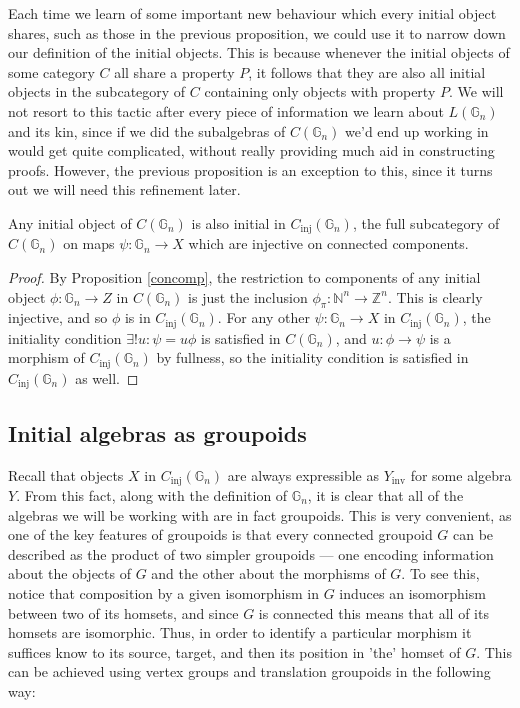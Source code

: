 \documentclass{amsart} %
\begin{document}
Each time we learn of some important new behaviour which every initial object shares, such as those in the previous proposition, we could use it to narrow down our definition of the initial objects. This is because whenever the initial objects of some category $C$ all share a property $P$, it follows that they are also all initial objects in the subcategory of $C$ containing only objects with property $P$. We will not resort to this tactic after every piece of information we learn about $L(\mathbb{G}_n)$ and its kin, since if we did the subalgebras of $C(\mathbb{G}_n)$ we'd end up working in would get quite complicated, without really providing much aid in constructing proofs. However, the previous proposition is an exception to this, since it turns out we will need this refinement later.

\begin{cor} Any initial object of $C(\mathbb{G}_n)$ is also initial in $C_{\mathrm{inj}}(\mathbb{G}_n)$, the full subcategory of $C(\mathbb{G}_n)$ on maps $\psi: \mathbb{G}_n \to X$ which are injective on connected components. 
\end{cor}
\begin{proof}
By Proposition \ref{concomp}, the restriction to components of any initial object $\phi: \mathbb{G}_n \to Z$ in $C(\mathbb{G}_n)$ is just the inclusion $\phi_\pi : \mathbb{N}^n \to \mathbb{Z}^n$. This is clearly injective, and so $\phi$ is in $C_{\mathrm{inj}}(\mathbb{G}_n)$. For any other $\psi: \mathbb{G}_n \to X$ in $C_{\mathrm{inj}}(\mathbb{G}_n)$, the initiality condition $\exists ! u : \psi = u \phi$ is satisfied in $C(\mathbb{G}_n)$, and $u: \phi \to \psi$ is a morphism of $C_{\mathrm{inj}}(\mathbb{G}_n)$ by fullness, so the initiality condition is satisfied in $C_{\mathrm{inj}}(\mathbb{G}_n)$ as well.
\end{proof}

\subsection{Initial algebras as groupoids}

Recall that objects $X$ in $C_{\mathrm{inj}}(\mathbb{G}_n)$ are always expressible as $Y_{\mathrm{inv}}$ for some algebra $Y$. From this fact, along with the definition of $\mathbb{G}_n$, it is clear that all of the algebras we will be working with are in fact groupoids. This is very convenient, as one of the key features of groupoids is that every connected groupoid $G$ can be described as the product of two simpler groupoids --- one encoding information about the objects of $G$ and the other about the morphisms of $G$. To see this, notice that composition by a given isomorphism in $G$ induces an isomorphism between two of its homsets, and since $G$ is connected this means that all of its homsets are isomorphic. Thus, in order to identify a particular morphism it suffices know to its source, target, and then its position in 'the' homset of $G$. This can be achieved using vertex groups and translation groupoids in the following way:
\end{document}
